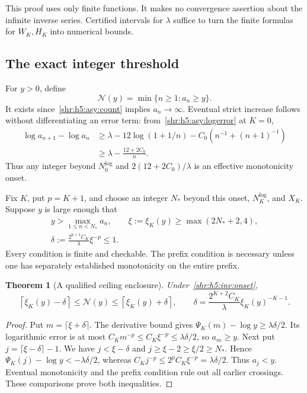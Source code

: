 \documentclass[11pt,letterpaper]{article}
\numberwithin{equation}{section}
\newtheorem{theorem}{Theorem}[section]
\theoremstyle{definition}
\newcommand{\1}{\mathbf 1}
\begin{document}
This proof uses only finite functions. It makes no convergence assertion
about the infinite inverse series. Certified intervals for $\lambda$
suffice to turn the finite formulas for $W_K,H_K$ into numerical bounds.

\subsection{The exact integer threshold}
For $y>0$, define
\begin{equation}
 \mathcal N(y)=\min\{n\ge1:a_n\ge y\}.
 \label{shr:h5:inv:threshold}
\end{equation}
It exists since~\eqref{shr:h5:asy:count} implies $a_n\to\infty$.
Eventual strict increase follows without differentiating an error term:
from~\eqref{shr:h5:asy:logerror} at $K=0$,
\begin{align*}
 \log a_{n+1}-\log a_n
 &\ge\lambda-12\log(1+1/n)-C_0(n^{-1}+(n+1)^{-1})\\
 &\ge\lambda-\frac{12+2C_0}{n}.
\end{align*}
Thus any integer beyond $N_0^{\log}$ and
$2(12+2C_0)/\lambda$ is an effective monotonicity onset.

Fix $K$, put $p=K+1$, and choose an integer $N_*$ beyond this onset,
$N_K^{\log}$, and $X_K$. Suppose $y$ is large enough that
\begin{equation}
 \begin{gathered}
 y>\max_{1\le n<N_*}a_n,\qquad
 \xi:=\xi_K(y)\ge\max(2N_*+2,4),\\
 \delta:=\frac{2^{p+1}C_K}{\lambda}\xi^{-p}\le1.
 \end{gathered}
 \label{shr:h5:inv:onset}
\end{equation}
Every condition is finite and checkable. The prefix condition is necessary
unless one has separately established monotonicity on the entire prefix.

\begin{theorem}[A qualified ceiling enclosure]
\label{shr:h5:inv:envelope}
Under~\eqref{shr:h5:inv:onset},
\begin{equation}
 \left\lceil\xi_K(y)-\delta\right\rceil
 \le\mathcal N(y)\le
 \left\lceil\xi_K(y)+\delta\right\rceil,
 \qquad \delta=\frac{2^{K+2}C_K}{\lambda}\xi_K(y)^{-K-1}.
 \label{shr:h5:inv:ceilings}
\end{equation}
\end{theorem}
\begin{proof}
Put $m=\lceil\xi+\delta\rceil$. The derivative bound gives
$\Psi_K(m)-\log y\ge\lambda\delta/2$.
Its logarithmic error is at most $C_Km^{-p}\le C_K\xi^{-p}
\le\lambda\delta/2$, so $a_m\ge y$.
Next put $j=\lceil\xi-\delta\rceil-1$. We have
$j<\xi-\delta$ and $j\ge\xi-2\ge\xi/2\ge N_*$.
Hence $\Psi_K(j)-\log y<-\lambda\delta/2$, whereas
$C_Kj^{-p}\le2^pC_K\xi^{-p}=\lambda\delta/2$.
Thus $a_j<y$. Eventual monotonicity and the prefix condition rule out
all earlier crossings. These comparisons prove both inequalities.
\end{proof}
\end{document}
